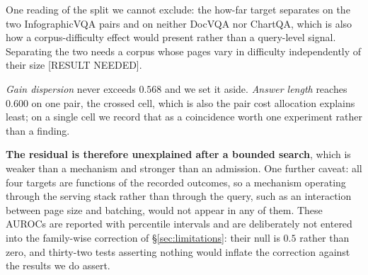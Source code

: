 \documentclass[10pt,twocolumn]{article}
\theoremstyle{plain}
\begin{document}
One reading of the split we cannot exclude: the how-far target separates on
the two InfographicVQA pairs and on neither DocVQA nor ChartQA, which is also
how a corpus-difficulty effect would present rather than a query-level signal.
Separating the two needs a corpus whose pages vary in difficulty independently
of their size [RESULT NEEDED].

\emph{Gain dispersion} never exceeds $0.568$ and we set it aside.
\emph{Answer length} reaches $0.600$ on one pair, the crossed cell, which is
also the pair cost allocation explains least; on a single cell we record that
as a coincidence worth one experiment rather than a finding.

\textbf{The residual is therefore unexplained after a bounded search}, which is
weaker than a mechanism and stronger than an admission. One further caveat: all
four targets are functions of the recorded outcomes, so a mechanism operating
through the serving stack rather than through the query, such as an interaction
between page size and batching, would not appear in any of them. These AUROCs
are reported with percentile intervals and are deliberately not entered into
the family-wise correction of \S\ref{sec:limitations}: their null is $0.5$
rather than zero, and thirty-two tests asserting nothing would inflate the
correction against the results we do assert.
\end{document}
